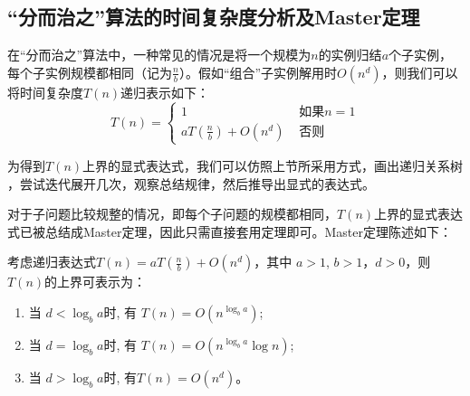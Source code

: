 %



\subsection{“分而治之”算法的时间复杂度分析及Master定理}
在“分而治之”算法中，一种常见的情况是将一个规模为$n$的实例归结$a$个子实例，每个子实例规模都相同（记为$\tfrac{n}{b}$）。假如“组合”子实例解用时$O(n^d)$，则我们可以将时间复杂度$T(n)$递归表示如下：
\[
	T(n) = \begin{cases} 
		1 & \text{ 如果} n = 1 \nonumber \\ 
	a T(\tfrac{n}{b}) + O(n^d)  & \text{ 否则}  \nonumber 
	 	\end{cases}
\]

为得到$T(n)$上界的显式表达式，我们可以仿照上节所采用方式，画出递归关系树
，尝试迭代展开几次，观察总结规律，然后推导出显式的表达式。

对于子问题比较规整的情况，即每个子问题的规模都相同，$T(n)$上界的显式表达式已被总结成Master定理\cite{PapadimitriouBook}，因此只需直接套用定理即可。Master定理陈述如下：

\begin{theorem}
 考虑递归表达式$T(n)=aT(\frac{n}{b}) + O(n^d)$，其中 $a > 1$, $b>1$，$d > 0$，则$T(n)$的上界可表示为：
\begin{enumerate}
 \item 当 $d < \log_b a $时, 有 $T(n)=O(n^{\log_b a })$;
 \item 当 $d = \log_b a $时, 有 $T(n)=O(n^{\log_b a } \log n )$;
 \item 当 $d > \log_b a $时, 有$T(n)=O( n^d )$。
\end{enumerate}
\end{theorem}


